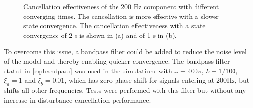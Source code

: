 \begin{figure}[h!]
  \centering %
  \qquad
  \caption{\label{fig:convergence} Cancellation effectiveness of the 200 Hz component with different converging times. The cancellation is more effective with a slower state convergence. The cancellation effectiveness with a state convergence of 2 s is shown in (a) and of 1 s in (b).}
\end{figure}

To overcome this issue, a bandpass filter could be added to reduce the noise level of the model and thereby enabling quicker convergence. The bandpass filter stated in \eqref{eq:bandpass} was used in the simulations with $\omega=400\pi$, $k=1/100$, $\xi_a=1$ and $\xi_b=0.01$, which has zero phase shift for signals entering at 200Hz, but shifts all other frequencies. Tests were performed with this filter but without any increase in disturbance cancellation performance.

